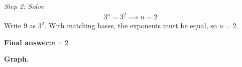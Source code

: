 \documentclass[11pt]{article}
\begin{document}
\textit{Step 2: Solve}
\[\begin{gathered}
3^n = 3^2 \implies n = 2
\end{gathered}\]
Write 9 as \( 3^2 \). With matching bases, the exponents must be equal, so \( n = 2 \).

\begin{answerbox}
\textbf{Final answer:}\quad \(\displaystyle n = 2\)
\end{answerbox}
\textbf{Graph.}

\begin{center}
\end{center}
\end{document}
